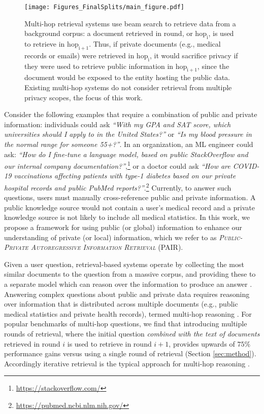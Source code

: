 \documentclass{article}
\renewcommand\cite{\citep}	\newcommand\shortcite{\citeyearpar}\newcommand\newcite{\citet}
\newcommand{\blue}[1]{{\color{blue}#1}}
\newcommand{\problemlongname}{\textsc{Public-Private Autoregressive Information Retrieval}\xspace}
\newcommand{\problemshortname}{\textsc{PAIR}\xspace}
\begin{document}
\begin{figure}
    \centering
    \texttt{[image: Figures\_FinalSplits/main\_figure.pdf]}
    \caption[width=\linewidth]{Multi-hop retrieval systems use beam search to retrieve data from a background corpus: a document retrieved in round, or \textit{$\mathrm{hop_i}$}, is used to retrieve in $\mathrm{hop_{i+1}}$. Thus, if private documents (e.g., medical records or emails) were retrieved in $\mathrm{hop_i}$, it would sacrifice privacy if they were used to retrieve public information in $\mathrm{hop_{i+1}}$, since the document would be exposed to the entity hosting the public data. Existing multi-hop systems do not consider retrieval from multiple privacy scopes, the focus of this work.}
    \label{fig:main}
    \vspace{-5mm}
\end{figure}

Consider the following examples that require a combination of public and \blue{private} information: individuals could ask \textit{``With \blue{my GPA and SAT score}, which universities should I apply to in the United States?''} or \textit{``Is \blue{my blood pressure} in the normal range for someone 55+?''}. In an organization, an ML engineer could ask: \textit{``How do I fine-tune a language model, based on public StackOverflow and \blue{our internal company documentation}?''},\footnote{\url{https://stackoverflow.com/}} or a doctor could ask \textit{``How are COVID-19 vaccinations affecting patients with type-1 diabetes based on \blue{our private hospital records} and public PubMed reports?''}.\footnote{\url{https://pubmed.ncbi.nlm.nih.gov/}}
Currently, to answer such questions, users must manually cross-reference public and private information. A public knowledge source would not contain a user's medical record and a private knowledge source is not likely to include all medical statistics.
In this work, we propose a framework for using public (or global) information to enhance our understanding of private (or local) information, which we refer to as \textit{\problemlongname} (\problemshortname).

Given a user question, retrieval-based systems operate by collecting the most similar documents to the question from a massive corpus, and providing these to a separate model which can reason over the information to produce an answer \cite{chen2017retrieveread}. Answering complex questions about public and private data requires reasoning over information that is distributed across multiple documents (e.g., public medical statistics and private health records), termed multi-hop reasoning \cite{welbl2018mhtask}. For popular benchmarks of multi-hop questions, we find that introducing multiple rounds of retrieval, where the initial question \textit{combined with the text of documents} retrieved in round $i$ is used to retrieve in round $i+1$, provides upwards of $75\%$ performance gains versus using a single round of retrieval (Section \ref{sec:method}). Accordingly iterative retrieval is the typical approach for multi-hop reasoning \cite{miller2016kvm, feldman2019multihop, asai2020graphpathsqa, xiong2021mdr, qi2021irrrqa, khattab2021baleen}. 
\end{document}
